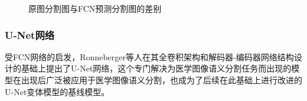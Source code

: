 \begin{figure}[htbp]
    \centering
    \hspace{1cm}
    \hspace{1cm}
    \caption{原图分割图与FCN预测分割图的差别\cite{shelhamer2016}}
    \label{fig:fcn_pre}
\end{figure}

\subsubsection{U-Net网络}

受FCN网络的启发，Ronneberger等人在其全卷积架构和解码器-编码器网络结构设计的基础上提出了U-Net网络，这个专门解决为医学图像语义分割任务而出现的模型在出现后广泛被应用于医学图像语义分割，也成为了后续在此基础上进行改进的U-Net变体模型的基线模型。

